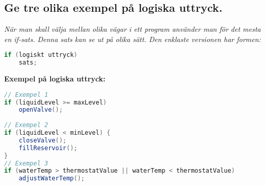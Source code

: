 \documentclass[../main.tex]{subfiles}
\begin{document}
\subsection{Ge tre olika exempel på logiska uttryck.}

\textit{När man skall välja mellan olika vägar i ett program använder man för det mesta en if-sats.}
\textit{Denna sats kan se ut på olika sätt. Den enklaste versionen har formen:}
\begin{lstlisting}[language=java]
if (logiskt uttryck)
    sats;
\end{lstlisting}

\textbf{Exempel på logiska uttryck:}

\begin{lstlisting}[language=java]
// Exempel 1
if (liquidLevel >= maxLevel)
    openValve();
    
// Exempel 2
if (liquidLevel < minLevel) {
    closeValve();
    fillReservoir();
}
// Exempel 3
if (waterTemp > thermostatValue || waterTemp < thermostatValue)
    adjustWaterTemp();
    
\end{lstlisting}
\end{document}
